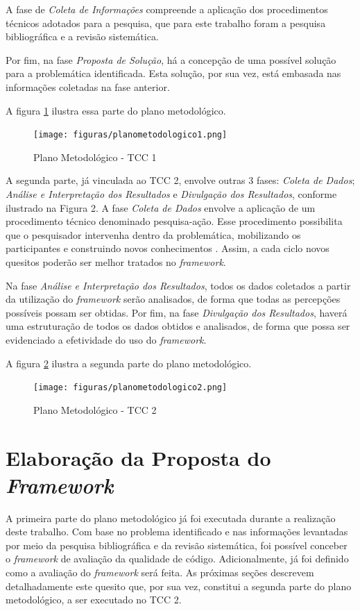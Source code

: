 A fase de \textit{Coleta de Informações} compreende a aplicação dos procedimentos técnicos adotados para a pesquisa, que para este trabalho foram a pesquisa bibliográfica e a revisão sistemática.

Por fim, na fase \textit{Proposta de Solução}, há a concepção de uma possível solução para a problemática identificada. Esta solução, por sua vez, está embasada nas informações coletadas na fase anterior.

A figura \ref{fig:plano1} ilustra essa parte do plano metodológico.

\begin{figure}[h]
\texttt{[image: figuras/planometodologico1.png]}
\caption{Plano Metodológico - TCC 1}
\label{fig:plano1}
\end{figure}

A segunda parte, já vinculada ao TCC 2, envolve outras 3 fases: \textit{Coleta de Dados}; \textit{Análise e Interpretação dos Resultados} e \textit{Divulgação dos Resultados}, conforme ilustrado na Figura 2.
A fase \textit{Coleta de Dados} envolve a aplicação de um procedimento técnico denominado pesquisa-ação. Esse procedimento possibilita que o pesquisador intervenha dentro da problemática, mobilizando os participantes e construindo novos conhecimentos \cite{pesquisa}. Assim, a cada ciclo novos quesitos poderão ser melhor tratados no \textit{framework}.

Na fase \textit{Análise e Interpretação dos Resultados}, todos os dados coletados a partir da utilização do \textit{framework} serão analisados, de forma que todas as percepções possíveis possam ser obtidas. Por fim, na fase \textit{Divulgação dos Resultados}, haverá uma estruturação de todos os dados obtidos e analisados, de forma que possa ser evidenciado a efetividade do uso do \textit{framework}.

A figura \ref{fig:plano2} ilustra a segunda parte do plano metodológico.

\begin{figure}[h]
\texttt{[image: figuras/planometodologico2.png]}
\caption{Plano Metodológico - TCC 2}
\label{fig:plano2}
\end{figure}

\section{Elaboração da Proposta do \textit{Framework}}

A primeira parte do plano metodológico já foi executada durante a realização deste trabalho. Com base no problema identificado e nas informações levantadas por meio da pesquisa bibliográfica e da revisão sistemática, foi possível conceber o \textit{framework} de avaliação da qualidade de código. Adicionalmente, já foi definido como a avaliação do \textit{framework} será feita. As próximas seções descrevem detalhadamente este quesito que, por sua vez, constitui a segunda parte do plano metodológico, a ser executado no TCC 2.

